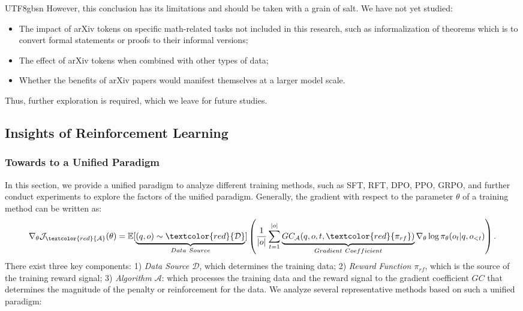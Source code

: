 \documentclass[11pt, a4paper, logo, copyright, nonumbering]{deepseek}
\begin{document}
\begin{CJK*}{UTF8}{gbsn}
However, this conclusion has its limitations and should be taken with a grain of salt.
We have not yet studied:
\begin{itemize}[topsep=0pt]
    \item The impact of arXiv tokens on specific math-related tasks not included in this research, such as informalization of theorems which is to convert formal statements or proofs to their informal versions;
    \item The effect of arXiv tokens when combined with other types of data;
    \item Whether the benefits of arXiv papers would manifest themselves at a larger model scale.
\end{itemize}
Thus, further exploration is required, which we leave for future studies.

\subsection{Insights of Reinforcement Learning}
\subsubsection{Towards to a Unified Paradigm}
In this section, we provide a unified paradigm to analyze different training methods, such as SFT, RFT, DPO, PPO, GRPO, and further conduct experiments to explore the factors of the unified paradigm. 
Generally, the gradient with respect to the parameter $\theta$ of a training method can be written as:
\begin{equation}
    \nabla_{\theta}\mathcal{J}_{\textcolor{red}{\mathcal{A}}}(\theta) = \mathbb{E}[\underbrace{(q,o) \sim \textcolor{red}{\mathcal{D}}}_{Data \ Source}]\left( \frac{1}{|o|} \sum_{t=1}^{|o|}  \underbrace{GC_{{\mathcal{A}}}(q, o, t, \textcolor{red}{\pi_{{rf}}})}_{Gradient \ Coefficient}  \nabla_{\theta}\log \pi_{\theta}(o_t | q, o_{<t})\right).
\label{eq:objective}
\end{equation}
There exist three key components: 
1) \textit{Data Source $\mathcal{D}$}, which determines the training data;
2) \textit{Reward Function $\pi_{{rf}}$}, which is the source of the training reward signal;
3) \textit{Algorithm $\mathcal{A}$}: which processes the training data and the reward signal to the gradient coefficient $GC$ that determines the magnitude of the penalty or reinforcement for the data. We analyze several representative methods based on such a unified paradigm:


\end{CJK*}
\end{document}
